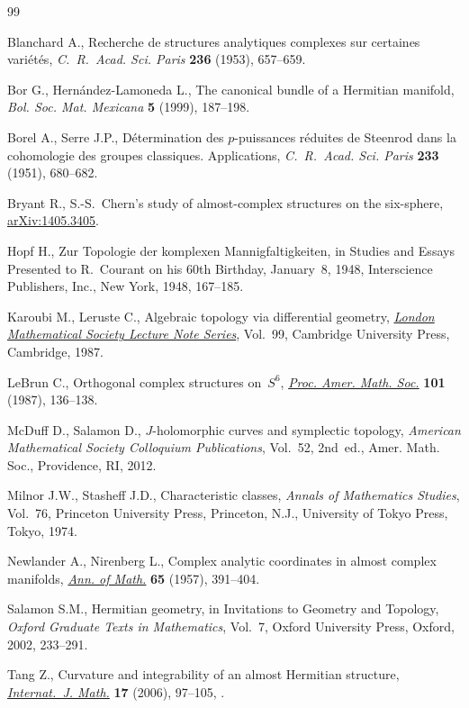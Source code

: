\documentclass[10pt,a4paper]{amsart}
\numberwithin{equation}{section}
\begin{document}

\begin{thebibliography}{99}
\footnotesize\itemsep=0pt

Blanchard A., Recherche de structures analytiques complexes sur certaines
 vari\'et\'es, \textit{C.~R.~Acad. Sci. Paris} \textbf{236} (1953), 657--659.

Bor G., Hern\'andez-Lamoneda L., The canonical bundle of a {H}ermitian
 manifold, \textit{Bol. Soc. Mat. Mexicana} \textbf{5} (1999), 187--198.

Borel A., Serre J.P., D\'etermination des {$p$}-puissances r\'eduites de
 {S}teenrod dans la cohomologie des groupes classiques. {A}pplications,
 \textit{C.~R.~Acad. Sci. Paris} \textbf{233} (1951), 680--682.

Bryant R., {S}.-{S}.~{C}hern's study of almost-complex structures on the
 six-sphere, \href{https://arxiv.org/abs/1405.3405}{arXiv:1405.3405}.

Hopf H., Zur {T}opologie der komplexen {M}annigfaltigkeiten, in Studies and
 {E}ssays {P}resented to {R}.~{C}ourant on his 60th {B}irthday, {J}anuary~8,
 1948, Interscience Publishers, Inc., New York, 1948, 167--185.

Karoubi M., Leruste C., Algebraic topology via differential geometry,
 \href{https://doi.org/10.1017/CBO9780511629372}{\textit{London Mathematical Society Lecture Note Series}}, Vol.~99, Cambridge
 University Press, Cambridge, 1987.

LeBrun C., Orthogonal complex structures on~{$S^6$}, \href{https://doi.org/10.2307/2046564}{\textit{Proc. Amer. Math.
 Soc.}} \textbf{101} (1987), 136--138.

McDuff D., Salamon D., {$J$}-holomorphic curves and symplectic topology,
 \textit{American Mathematical Society Colloquium Publications}, Vol.~52, 2nd~ed., Amer. Math. Soc., Providence, RI, 2012.

Milnor J.W., Stasheff J.D., Characteristic classes, \textit{Annals of
 Mathematics Studies}, Vol.~76, Princeton University Press, Princeton, N.J.,
 University of Tokyo Press, Tokyo, 1974.

Newlander A., Nirenberg L., Complex analytic coordinates in almost complex
 manifolds, \href{https://doi.org/10.2307/1970051}{\textit{Ann. of Math.}} \textbf{65} (1957), 391--404.

Salamon S.M., Hermitian geometry, in Invitations to Geometry and Topology,
 \textit{Oxford Graduate Texts in Mathematics}, Vol.~7, Oxford University
 Press, Oxford, 2002, 233--291.

Tang Z., Curvature and integrability of an almost {H}ermitian structure,
 \href{https://doi.org/10.1142/S0129167X0600331X}{\textit{Internat.~J. Math.}} \textbf{17} (2006), 97--105,
.

\end{thebibliography}
\end{document}
